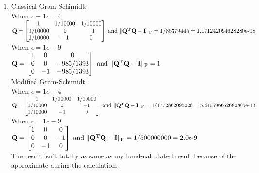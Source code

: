\documentclass[english,onecolumn]{IEEEtran}
\begin{document}
\begin{enumerate}
    
    
    
    
    
    
    
    
    
    
    

    \item
    Classical Gram-Schimidt:\\
    When $    \epsilon = 1e-4 $\\
    $ \bf{Q} = 
    \begin{bmatrix}
    1 & 1/10000 & 1/10000 \\
    1/10000 & 0 & -1 \\
    1/10000 & -1 & 0 
    \end{bmatrix}\text{ and }
    \|{\bf Q}^T {\bf Q} - {\bf I}\|_{\text{F}} =\text{1/85379445}= \text{1.171242094628280e-08}
    $\\
    When $
    \epsilon = 1e-9 $\\
    $ \bf{Q} = 
    \begin{bmatrix}
    1 & 0 & 0 \\
    0 & 0 & -985/1393 \\
    0 & -1 & -985/1393
    \end{bmatrix}\text{ and }
    \|{\bf Q}^T {\bf Q} - {\bf I}\|_{\text{F}} = \text{1}
    $\\
    Modified Gram-Schimidt:\\
    When $
    \epsilon = 1e-4 $\\
    $ \bf{Q} = 
    \begin{bmatrix}
    1 & 1/10000 & 1/10000 \\
    1/10000 & 0 & -1 \\
    1/10000 & -1 & 0 
    \end{bmatrix}\text{ and }
    \|{\bf Q}^T {\bf Q} - {\bf I}\|_{\text{F}} = \text{1/1772862095226} =\text{5.640596652682805e-13}
    $\\
    When $
    \epsilon = 1e-9 $\\
    $ \bf{Q} = 
    \begin{bmatrix}
    1 & 0 & 0 \\
    0 & 0 & -1 \\
    0 & -1 & 0
    \end{bmatrix}\text{ and }
    \|{\bf Q}^T {\bf Q} - {\bf I}\|_{\text{F}} =\text{1/500000000} =\text{2.0e-9}
    $\\
    The result isn't totally as same as my hand-calculated result because of the approximate during the calculation.

    
    
    
    
    
    
    
    
    
    
    
    
    
\end{enumerate}
\end{document}
